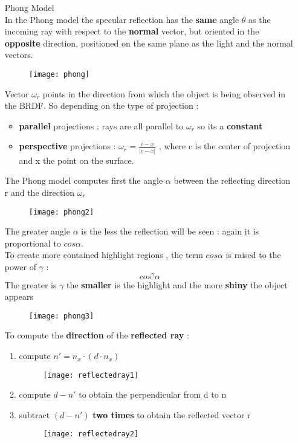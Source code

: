 \begin{itemize}
\item[Phong Model]\hfill\\
In the Phong model the specular reflection  has the \textbf{same} angle $\theta$ as the incoming ray with respect to the \textbf{normal} vector, but oriented in the \textbf{opposite} direction, positioned on the same plane as the light and the normal vectors.
\begin{figure}[H]
  \centering
  \texttt{[image: phong]}
\end{figure}
Vector $\omega_r$ points in the direction from which the object is being observed in the BRDF. So depending on the type of projection  :
\begin{itemize}
\item \textbf{parallel} projections : rays are all parallel to $\omega_r$  so its a \textbf{constant}
\item \textbf{perspective} projections : $\omega_r =\frac{c-x}{|c-x|} $ , where c is the center of projection and x the point on the surface.
\end{itemize}
The Phong model computes first the angle $\alpha$ between the reflecting direction r and the direction $\omega_r$
\begin{figure}[H]
  \centering
  \texttt{[image: phong2]}
\end{figure}
The greater angle $\alpha$ is the less the reflection will be seen : again it is proportional to $cos\alpha$. \\
To create more contained highlight regions , the term $cos\alpha$ is raised to the power of $\gamma$ : 
$$ cos^{\gamma}\alpha$$
The greater is $\gamma$ the \textbf{smaller} is the highlight and the more \textbf{shiny} the object appears
\begin{figure}[H]
  \centering
  \texttt{[image: phong3]}
\end{figure}
To compute the \textbf{direction} of the \textbf{reflected ray} :
\begin{enumerate}
\item compute $n' = n_x\cdot (d \cdot n_x)$ 
\begin{figure}[H]
  \centering
  \texttt{[image: reflectedray1]}
\end{figure}
\item compute $d-n'$ to obtain the perpendicular from d to n
\item subtract $(d-n')$ \textbf{two times} to obtain the reflected vector r
\begin{figure}[H]
  \centering
  \texttt{[image: reflectedray2]}
\end{figure} 
\end{enumerate}


\end{itemize}
